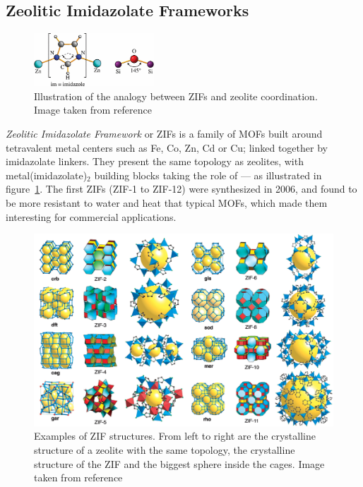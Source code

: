 \documentclass[thesis]{subfiles}
\begin{document}
\newpage
\subsection{Zeolitic Imidazolate Frameworks}

\begin{figure}[ht]
    \centering
    \includegraphics[width=0.4\textwidth]{figures/cited/zeolite-to-zif}
    \caption{Illustration of the analogy between ZIFs and zeolite coordination.
    Image taken from reference~\cite{Bennett2010}}
    \label{fig:zeolite-to-zif}
\end{figure}

\emph{Zeolitic Imidazolate Framework} or ZIFs is a family of MOFs built around
tetravalent metal centers such as Fe, Co, Zn, Cd or Cu; linked together by
imidazolate linkers. They present the same topology as zeolites, with
metal(imidazolate)$_2$ building blocks taking the role of  --- as
illustrated in figure~\ref{fig:zeolite-to-zif}. The first ZIFs (ZIF-1 to ZIF-12)
were synthesized in 2006\cite{Park2006}, and found to be more resistant to water
and heat that typical MOFs, which made them interesting for commercial
applications.

\begin{figure}[ht]
    \centering
    \includegraphics[width=\textwidth]{figures/cited/zif-examples}
    \caption{Examples of ZIF structures. From left to right are the crystalline
    structure of a zeolite with the same topology, the crystalline structure of
    the ZIF and the biggest sphere inside the cages. Image taken from
    reference~\cite{Park2006}}
    \label{fig:zif-examples}
\end{figure}
\end{document}
